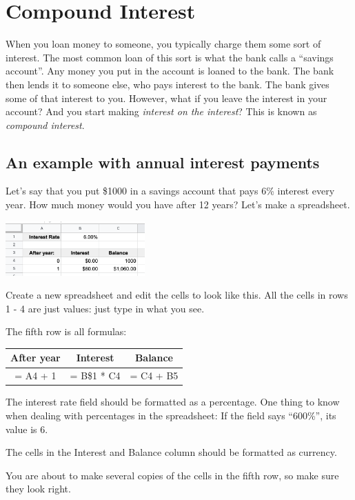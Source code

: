 \chapter{Compound Interest}

When you loan money to someone, you typically charge them some sort of
interest. The most common loan of this sort is what the bank calls a
``savings account''.  Any money you put in the account is loaned to
the bank. The bank then lends it to someone else, who pays interest to
the bank. The bank gives some of that interest to you.
However, what if you leave the interest in your account? And you start
making \textit{interest on the interest}? This is known as
\textit{compound interest}.

\section{An example with annual interest payments}

Let's say that you put \$1000 in a savings account that pays 6\%
interest every year. How much money would you have after 12 years?
Let's make a spreadsheet.

\includegraphics[width=0.4\textwidth]{StartInterest.png}

Create a new spreadsheet and edit the cells to look like this.  All
the cells in rows 1 - 4 are just values: just type in what you
see.

The fifth row is all formulas:

\begin{tabular}{c | c | c}
  After year & Interest & Balance \\
  \hline 
  = A4 + 1 & = B\$1 * C4 & = C4 + B5 \\
\end{tabular}

The interest rate field should be formatted as a percentage. One thing
to know when dealing with percentages in the spreadsheet: If the field
says ``600\%'', its value is 6. 

The cells in the Interest and Balance column should be formatted as currency.

You are about to make several copies of the cells in the fifth row,
so make sure they look right.

